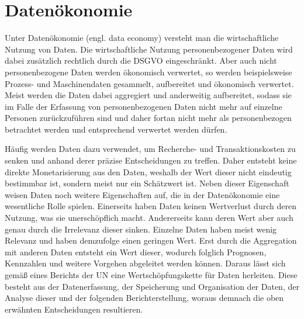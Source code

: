 \section{Datenökonomie} \label{datenoekonomie}
Unter Datenökonomie (engl. data economy) versteht man die wirtschaftliche Nutzung von Daten. Die wirtschaftliche Nutzung personenbezogener Daten wird dabei zusätzlich rechtlich durch die DSGVO eingeschränkt. Aber auch nicht personenbezogene Daten werden ökonomisch verwertet, so werden beispielsweise Prozess- und Maschinendaten gesammelt, aufbereitet und ökonomisch verwertet. \cite{bpb_2019} Meist werden die Daten dabei aggregiert und anderweitig aufbereitet, sodass sie im Falle der Erfassung von personenbezogenen Daten nicht mehr auf einzelne Personen zurückzuführen sind und daher fortan nicht mehr als personenbezogen betrachtet werden und entsprechend verwertet werden dürfen. \newline

\noindent Häufig werden Daten dazu verwendet, um Recherche- und Transaktionskosten zu senken und anhand derer präzise Entscheidungen zu treffen. Daher entsteht keine direkte Monetarisierung aus den Daten, weshalb der Wert dieser nicht eindeutig bestimmbar ist, sondern meist nur ein Schätzwert ist. Neben dieser Eigenschaft weisen Daten noch weitere Eigenschaften auf, die in der Datenökonomie eine wesentliche Rolle spielen. Einerseits haben Daten keinen Wertverlust durch deren Nutzung, was sie unerschöpflich macht. Andererseits kann deren Wert aber auch genau durch die Irrelevanz dieser sinken. Einzelne Daten haben meist wenig Relevanz und haben demzufolge einen geringen Wert. Erst durch die Aggregation mit anderen Daten entsteht ein Wert dieser, wodurch folglich Prognosen, Kennzahlen und weitere Vorgehen abgeleitet werden können. Daraus lässt sich gemäß eines Berichts der \gls{UN} eine Wertschöpfungskette für Daten herleiten. Diese besteht aus der Datenerfassung, der Speicherung und Organisation der Daten, der Analyse dieser und der folgenden Berichterstellung, woraus demnach die oben erwähnten Entscheidungen resultieren. \cite{un_2019} \newline

